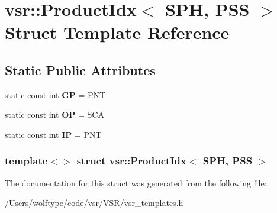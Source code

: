 \hypertarget{structvsr_1_1_product_idx_3_01_s_p_h_00_01_p_s_s_01_4}{\section{vsr\-:\-:Product\-Idx$<$ S\-P\-H, P\-S\-S $>$ Struct Template Reference}
\label{structvsr_1_1_product_idx_3_01_s_p_h_00_01_p_s_s_01_4}
}
\subsection*{Static Public Attributes}
\begin{DoxyCompactItemize}
\item 
\hypertarget{structvsr_1_1_product_idx_3_01_s_p_h_00_01_p_s_s_01_4_a81b2b9548833f7b1669a7451406022dd}{static const int {\bfseries G\-P} = P\-N\-T}\label{structvsr_1_1_product_idx_3_01_s_p_h_00_01_p_s_s_01_4_a81b2b9548833f7b1669a7451406022dd}

\item 
\hypertarget{structvsr_1_1_product_idx_3_01_s_p_h_00_01_p_s_s_01_4_ad451e800a5eb85fe1b4a625e7a936e80}{static const int {\bfseries O\-P} = S\-C\-A}\label{structvsr_1_1_product_idx_3_01_s_p_h_00_01_p_s_s_01_4_ad451e800a5eb85fe1b4a625e7a936e80}

\item 
\hypertarget{structvsr_1_1_product_idx_3_01_s_p_h_00_01_p_s_s_01_4_a2c69b78c4f0292b5f2785181df83b764}{static const int {\bfseries I\-P} = P\-N\-T}\label{structvsr_1_1_product_idx_3_01_s_p_h_00_01_p_s_s_01_4_a2c69b78c4f0292b5f2785181df83b764}

\end{DoxyCompactItemize}
\subsubsection*{template$<$$>$ struct vsr\-::\-Product\-Idx$<$ S\-P\-H, P\-S\-S $>$}



The documentation for this struct was generated from the following file\-:\begin{DoxyCompactItemize}
\item 
/\-Users/wolftype/code/vsr/\-V\-S\-R/vsr\-\_\-templates.\-h\end{DoxyCompactItemize}
